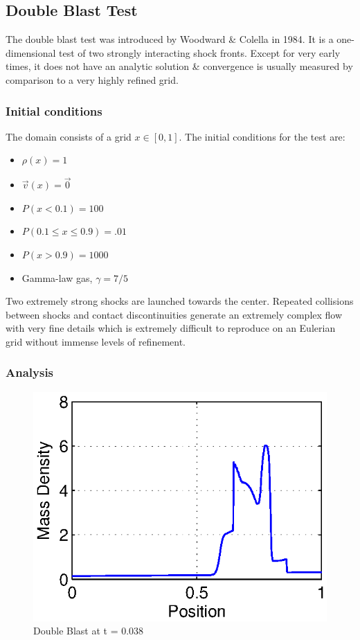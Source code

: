 
\subsection{Double Blast Test}

The double blast test was introduced by Woodward \& Colella in 1984. It is a one-dimensional test of two strongly
interacting shock fronts. Except for very early times, it does not have an analytic solution \& convergence is
usually measured by comparison to a very highly refined grid.

\subsubsection{Initial conditions}

The domain consists of a grid $x \in [0, 1]$. The initial conditions for the test are:
\begin{itemize}
\item $\rho(x) = 1$
\item $\vec{v}(x) = \vec{0}$
\item $P(x < 0.1) = 100$
\item $P(0.1 \le x \le 0.9) = .01$
\item $P(x > 0.9) = 1000$
\item Gamma-law gas, $\gamma = 7/5$
\end{itemize}

Two extremely strong shocks are launched towards the center. Repeated collisions between shocks and contact
discontinuities generate an extremely complex flow with very fine details which is extremely difficult to reproduce
on an Eulerian grid without immense levels of refinement.

\subsubsection{Analysis}

\begin{figure}
\begin{center}
\includegraphics{DoubleBlast.eps}
\caption{Double Blast at t = 0.038}
\end{center}
\end{figure}
